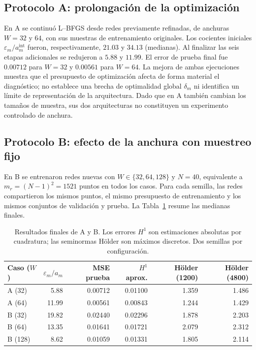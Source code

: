 \subsection{Protocolo A: prolongación de la optimización}

En A se continuó L--BFGS desde redes previamente refinadas, de
anchuras $W=32$ y $64$, con sus muestras de entrenamiento originales.
Los cocientes iniciales $\varepsilon_m/a_m^{\mathrm{int}}$ fueron,
respectivamente, $21.03$ y $34.13$ (medianas). Al finalizar las
seis etapas adicionales se redujeron a $5.88$ y $11.99$.
El error de prueba final fue $0.00712$ para $W=32$ y $0.00561$
para $W=64$. La mejora de ambas ejecuciones muestra que el presupuesto
de optimización afecta de forma material el diagnóstico; no establece
una brecha de optimalidad global $\delta_m$ ni identifica un límite
de representación de la arquitectura. Dado que en A también cambian
los tamaños de muestra, sus dos arquitecturas no constituyen un
experimento controlado de anchura.

\subsection{Protocolo B: efecto de la anchura con muestreo fijo}

En B se entrenaron redes nuevas con $W\in\{32,64,128\}$ y
$N=40$, equivalente a $m_r=(N-1)^2=1521$ puntos en todos los casos.
Para cada semilla, las redes compartieron los mismos puntos, el mismo
presupuesto de entrenamiento y los mismos conjuntos de validación y
prueba. La Tabla~\ref{tab:abc_resumen} resume las medianas finales.

\begin{table}[htbp]
\centering
\caption{Resultados finales de A y B. Los errores $H^1$ son estimaciones absolutas por cuadratura; las seminormas H\"older son máximos discretos. Dos semillas por configuración.}
\label{tab:abc_resumen}
\small
\begin{tabular}{lrrrrr}
\hline
Caso ($W$) & $\varepsilon_m/a_m$ & MSE prueba & $H^1$ aprox. & H\"older (1200) & H\"older (4800) \\
\hline
A (32) & 5.88  & 0.00712 & 0.01100 & 1.359 & 1.486 \\
A (64) & 11.99 & 0.00561 & 0.00843 & 1.244 & 1.429 \\
B (32) & 19.82 & 0.02440 & 0.02296 & 1.878 & 2.203 \\
B (64) & 13.35 & 0.01641 & 0.01721 & 2.079 & 2.312 \\
B (128)& 8.62  & 0.01059 & 0.01331 & 1.805 & 2.114 \\
\hline
\end{tabular}
\end{table}

